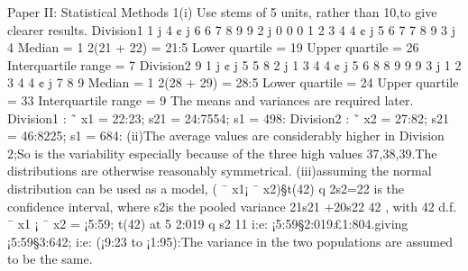 Paper II: Statistical Methods
1(i) Use stems of 5 units, rather than 10,to give clearer results.
Division1
1 j 4
¢ j 6 6 7 8 9 9
2 j 0 0 0 1 2 3 4 4
¢ j 5 6 7 7 8 9
3 j 4
Median = 1
2(21 + 22) = 21:5
Lower quartile = 19
Upper quartile = 26
Interquartile range = 7
Division2
9
1 j
¢ j 5 5 8
2 j 1 3 4 4
¢ j 5 6 8 8 9 9 9
3 j 1 2 3 4 4
¢ j 7 8 9
Median = 1
2(28 + 29) = 28:5
Lower quartile = 24
Upper quartile = 33
Interquartile range = 9
The means and variances are required later.
Division1 : ˜ x1 = 22:23; s21
= 24:7554; s1 = 498:
Division2 : ˜ x2 = 27:82; s21
= 46:8225; s1 = 684:
(ii)The average values are considerably higher in Division 2;So is the variability
especially because of the three high values 37,38,39.The distributions are otherwise reasonably
symmetrical.
(iii)assuming the normal distribution can be used as a model, ( ¯ x1¡ ¯ x2)§t(42)
q
2s2=22
is the confidence interval, where s2is the pooled variance 21s21
+20s22
42 , with 42 d.f. ¯ x1 ¡
¯ x2 = ¡5:59; t(42) at 5%
2:019
q
s2
11 i:e: ¡5:59§2:019£1:804.giving ¡5:59§3:642; i:e: (¡9:23 to ¡1:95):The
variance in the two populations are assumed to be the same.
